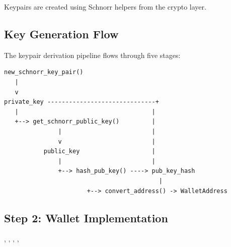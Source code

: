 Keypairs are created using Schnorr helpers from the crypto layer.

\subsection{Key Generation Flow}
\label{sec:key-gen-flow}

The keypair derivation pipeline flows through five stages:

\begin{verbatim}
new_schnorr_key_pair()
   |
   v
private_key ------------------------------+
   |                                     |
   +--> get_schnorr_public_key()         |
               |                         |
               v                         |
           public_key                    |
               |                         |
               +--> hash_pub_key() ----> pub_key_hash
                                           |
                       +--> convert_address() -> WalletAddress
\end{verbatim}

\subsection{Step 2: Wallet Implementation}
\label{sec:wallet-impl}

\begin{infobox}
, , , , 
\end{infobox}

